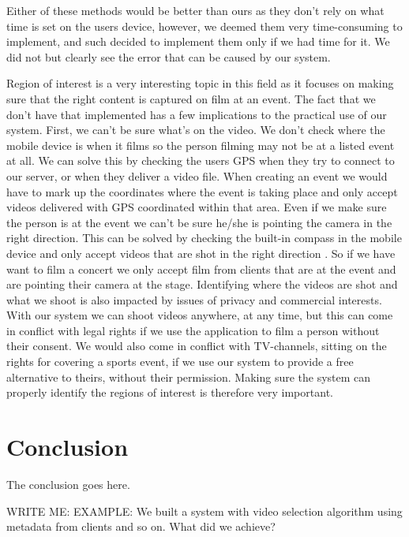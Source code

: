 \documentclass[conference]{IEEEtran}
\begin{document}
Either of these methods would be better than ours as they don’t rely on what time is set on the users device,
however, we deemed them very time-consuming to implement, and such decided to implement them only if we had
time for it. We did not but clearly see the error that can be caused by our system.

Region of interest is a very interesting topic in this field as it focuses on making sure that the right
content is captured on film at an event. The fact that we don’t have that implemented has a few implications
to the practical use of our system. First, we can’t be sure what’s on the video. We don’t check where the
mobile device is when it films so the person filming may not be at a listed event at all. We can solve this
by checking the users GPS when they try to connect to our server, or when they deliver a video file. 
When creating an event we would have to mark up the coordinates where the event is taking place and only
accept videos delivered with GPS coordinated within that area.
Even if we make sure the person is at the event we can’t be sure he/she is pointing the camera in the right
direction. This can be solved by checking the built-in compass in the mobile device and only accept videos
that are shot in the right direction \cite{cricri_sensor-based_2012}. So if we have want to film a concert
we only accept film from clients that are at the event and are pointing their camera at the stage. 
Identifying where the videos are shot and what we shoot is also impacted by issues of privacy and commercial
interests. With our system we can shoot videos anywhere, at any time, but this can come in conflict with legal
rights if we use the application to film a person without their consent. We would also come in conflict with
TV-channels, sitting on the rights for covering a sports event, if we use our system to provide a free
alternative to theirs, without their permission. Making sure the system can properly identify the regions
of interest is therefore very important.


\section{Conclusion}
The conclusion goes here.

WRITE ME:
EXAMPLE:
We built a system with video selection algorithm using metadata from clients and so on.
What did we achieve?



\end{document}
